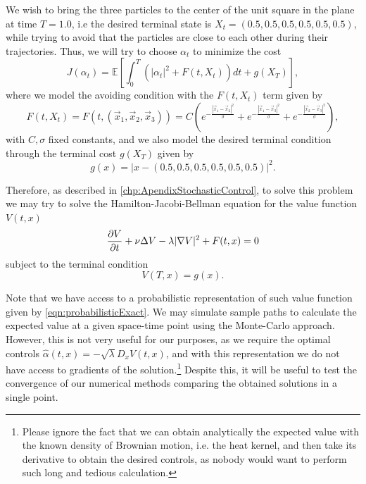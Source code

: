 We wish to bring the three particles to the center of the unit square in the plane at time $T=1.0$, i.e the desired terminal state is $X_t=(0.5,0.5,0.5,0.5,0.5,0.5)$, while trying to avoid that the particles are close to each other during their trajectories. Thus, we will try to choose $\alpha_t$ to minimize the cost
\begin{equation}
	J(\alpha_t)=\mathbb{E}\left[\int_{0}^{T}(|\alpha_t|^2+F(t,X_t)) dt +g(X_T)\right],
\end{equation}   
where we model the avoiding condition with the $F(t,X_t)$ term given by
\begin{equation}
	F(t,X_t)=F(t,(\vec{x}_1,\vec{x}_2,\vec{x}_3))=C\left(e^{-\frac{|\vec{x}_1-\vec{x}_2|^2}{\sigma}}+e^{-\frac{|\vec{x}_1-\vec{x}_3|^2}{\sigma}}+e^{-\frac{|\vec{x}_2-\vec{x}_3|^2}{\sigma}}\right),
\end{equation}
with $C,\sigma$ fixed constants, and we also model the desired terminal condition through the terminal cost $g(X_T)$ given by 
\begin{equation}
	g(x)=|x-(0.5,0.5,0.5,0.5,0.5,0.5)|^2.
\end{equation}

Therefore, as described in \autoref{chp:ApendixStochasticControl}, to solve this problem we may try to solve the Hamilton-Jacobi-Bellman equation for the value function $V(t,x)$
\begin{equation}
	\label{eqn:HJB_example}
	\frac{\partial V}{\partial t}+\nu \Delta V -\lambda |\nabla V|^2+F(t,x)=0
\end{equation}
subject to the terminal condition 
\begin{equation}
	V(T,x)=g(x).
\end{equation}

Note that we have access to a probabilistic representation of such value function given by \eqref{eqn:probabilisticExact}. We may simulate sample paths to calculate the expected value at a given space-time point using the Monte-Carlo approach. However, this is not very useful for our purposes, as we require the optimal controls $\hat{\alpha}(t,x)=-\sqrt{\lambda}D_x V(t,x)$, and with this representation we do not have access to gradients of the solution.\footnote{Please ignore the fact that we can obtain analytically the expected value with the known density of Brownian motion, i.e. the heat kernel, and then take its derivative to obtain the desired controls, as nobody would want to perform such long and tedious calculation.} Despite this, it will be useful to test the convergence of our numerical methods comparing the obtained solutions in a single point.


